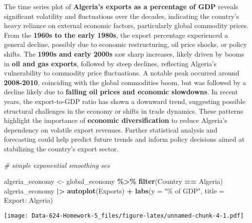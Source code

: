 \documentclass[
]{article}
\newenvironment{Shaded}{\begin{snugshade}}{\end{snugshade}}
\newcommand{\AttributeTok}[1]{\textcolor[rgb]{0.13,0.29,0.53}{#1}}
\newcommand{\CommentTok}[1]{\textcolor[rgb]{0.56,0.35,0.01}{\textit{#1}}}
\newcommand{\FunctionTok}[1]{\textcolor[rgb]{0.13,0.29,0.53}{\textbf{#1}}}
\newcommand{\NormalTok}[1]{#1}
\newcommand{\OtherTok}[1]{\textcolor[rgb]{0.56,0.35,0.01}{#1}}
\newcommand{\SpecialCharTok}[1]{\textcolor[rgb]{0.81,0.36,0.00}{\textbf{#1}}}
\newcommand{\StringTok}[1]{\textcolor[rgb]{0.31,0.60,0.02}{#1}}
\begin{document}
The time series plot of \textbf{Algeria's exports as a percentage of
GDP} reveals significant volatility and fluctuations over the decades,
indicating the country's heavy reliance on external economic factors,
particularly global commodity prices. From the \textbf{1960s to the
early 1980s}, the export percentage experienced a general decline,
possibly due to economic restructuring, oil price shocks, or policy
shifts. The \textbf{1990s and early 2000s} saw sharp increases, likely
driven by booms in \textbf{oil and gas exports}, followed by steep
declines, reflecting Algeria's vulnerability to commodity price
fluctuations. A notable peak occurred around \textbf{2008-2010},
coinciding with the global commodities boom, but was followed by a
decline likely due to \textbf{falling oil prices and economic
slowdowns}. In recent years, the export-to-GDP ratio has shown a
downward trend, suggesting possible structural challenges in the economy
or shifts in trade dynamics. These patterns highlight the importance of
\textbf{economic diversification} to reduce Algeria's dependency on
volatile export revenues. Further statistical analysis and forecasting
could help predict future trends and inform policy decisions aimed at
stabilizing the country's export sector.

\begin{Shaded}
\begin{Highlighting}[]
\CommentTok{\# simple exponential smoothing ses}

\NormalTok{algeria\_economy }\OtherTok{\textless{}{-}}\NormalTok{ global\_economy }\SpecialCharTok{\%\textgreater{}\%} 
  \FunctionTok{filter}\NormalTok{(Country }\SpecialCharTok{==} \StringTok{\textquotesingle{}Algeria\textquotesingle{}}\NormalTok{)}
\NormalTok{algeria\_economy }\SpecialCharTok{|\textgreater{}} 
  \FunctionTok{autoplot}\NormalTok{(Exports) }\SpecialCharTok{+}
  \FunctionTok{labs}\NormalTok{(}\AttributeTok{y =} \StringTok{"\% of GDP"}\NormalTok{, }\AttributeTok{title =} \StringTok{\textquotesingle{}Export: Algeria\textquotesingle{}}\NormalTok{)}
\end{Highlighting}
\end{Shaded}

\texttt{[image: Data-624-Homework-5\_files/figure-latex/unnamed-chunk-4-1.pdf]}
\end{document}
